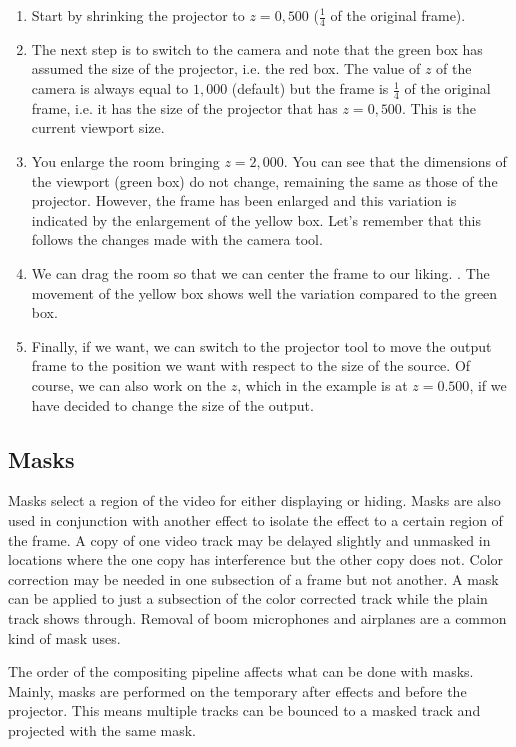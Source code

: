 \begin{enumerate}
    \item Start by shrinking the projector to $z=0,500$ ($\frac{1}{4}$ of the original frame).
    \item The next step is to switch to the camera and note that the green box has assumed the size of the projector, i.e. the red box. The value of $z$ of the camera is always equal to $1,000$ (default) but the frame is $\frac{1}{4}$ of the original frame, i.e. it has the size of the projector that has $z=0,500$. This is the current viewport size.
    \item You enlarge the room bringing $z=2,000$. You can see that the dimensions of the viewport (green box) do not change, remaining the same as those of the projector. However, the frame has been enlarged and this variation is indicated by the enlargement of the yellow box. Let's remember that this follows the changes made with the camera tool.
    \item We can drag the room so that we can center the frame to our liking. . The movement of the yellow box shows well the variation compared to the green box.
    \item Finally, if we want, we can switch to the projector tool to move the output frame to the position we want with respect to the size of the source. Of course, we can also work on the $z$, which in the example is at $z=0.500$, if we have decided to change the size of the output.
\end{enumerate}

\subsection{Masks}%
\label{sub:masks}

Masks select a region of the video for either displaying or hiding. 
Masks are also used in conjunction with another effect to isolate the effect to a certain region of the frame. 
A copy of one video track may be delayed slightly and unmasked in locations where the one copy has interference but the other copy does not. 
Color correction may be needed in one subsection of a frame but not another. 
A mask can be applied to just a subsection of the color corrected track while the plain track shows through. 
Removal of boom microphones and airplanes are a common kind of mask uses.

The order of the compositing pipeline affects what can be done with masks. Mainly, masks are performed on the temporary after effects and before the projector. This means multiple tracks can be bounced to a masked track and projected with the same mask.

